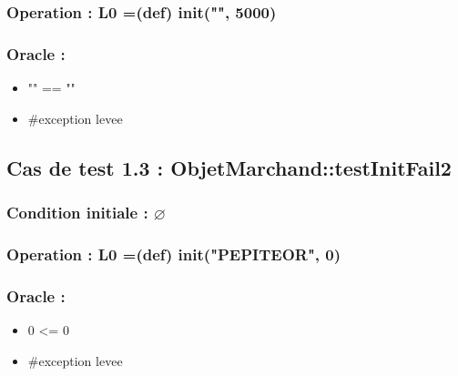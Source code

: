 \documentclass[11pt]{article}
\begin{document}
\subsubsection{Operation : L0 =(def) init("", 5000)}
\label{sec-1.2.2}

\subsubsection{Oracle :}
\label{sec-1.2.3}

\begin{itemize}

\item "" == ""\\
\label{sec-1.2.3.1}


\item \#exception levee\\
\label{sec-1.2.3.2}


\end{itemize} %
\subsection{Cas de test 1.3 : ObjetMarchand::testInitFail2}
\label{sec-1.3}

\subsubsection{Condition initiale : $\varnothing$}
\label{sec-1.3.1}

\subsubsection{Operation : L0 =(def) init("PEPITEOR", 0)}
\label{sec-1.3.2}

\subsubsection{Oracle :}
\label{sec-1.3.3}

\begin{itemize}

\item 0 <= 0\\
\label{sec-1.3.3.1}


\item \#exception levee\\
\label{sec-1.3.3.2}





\end{itemize} %
\end{document}
